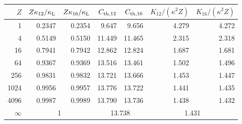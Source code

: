 \begin{tabular}{rrrrrrr}\toprule
$Z$ & $Z\kappa_{12}/\kappa_{\rm L}$ & $Z\kappa_{16}/\kappa_{\rm L}$ & $C_{\mathrm{th},12}$ & $C_{\mathrm{th},16}$ & $K_{12}/(\kappa^2Z)$ & $K_{16}/(\kappa^2Z)$\\\midrule
1 & 0.2347 & 0.2354 & 9.647 & 9.656 & 4.279 & 4.272 \\
4 & 0.5149 & 0.5150 & 11.449 & 11.465 & 2.315 & 2.318 \\
16 & 0.7941 & 0.7942 & 12.862 & 12.824 & 1.687 & 1.681 \\
64 & 0.9367 & 0.9369 & 13.516 & 13.461 & 1.502 & 1.496 \\
256 & 0.9831 & 0.9832 & 13.721 & 13.666 & 1.453 & 1.447 \\
1024 & 0.9956 & 0.9957 & 13.776 & 13.722 & 1.441 & 1.435 \\
4096 & 0.9987 & 0.9989 & 13.790 & 13.736 & 1.438 & 1.432 \\
\midrule
$\infty$ & \multicolumn{2}{c}{1} & \multicolumn{2}{c}{13.738} & \multicolumn{2}{c}{1.431} \\
\bottomrule\end{tabular}
